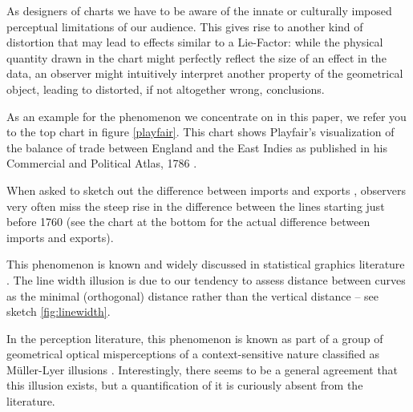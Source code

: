 As designers of charts we have to be aware of the innate or culturally imposed perceptual limitations of our audience. This gives rise to another kind of distortion that may lead to effects similar to a Lie-Factor: while the physical quantity drawn in the chart might  perfectly reflect the  size of an effect in the data, an observer might intuitively interpret another property of the geometrical object, leading to distorted, if not altogether wrong, conclusions. 

%


As an example for the phenomenon we concentrate on in this paper, we refer you to the top chart in  figure  \ref{playfair}. 
This chart shows Playfair's  visualization of the balance of trade between England and the East Indies as published in his Commercial and Political Atlas, 1786 \cite{playfair, playfair2}. 

When asked to sketch out the difference between imports and exports \citep{cleveland:1984}, observers very often miss the steep rise in the difference between the lines starting just before 1760 (see the chart at the bottom for the actual difference between imports and exports).

This phenomenon  is known and widely discussed in statistical graphics literature \citep{wainer:2000, robbins:2005}. The line width illusion is due to our  tendency to assess distance between curves as the minimal (orthogonal) distance rather than the  vertical distance -- see sketch \ref{fig:linewidth}.


In the perception literature, this phenomenon is known as part of a group of geometrical optical misperceptions of a context-sensitive nature classified as M\"uller-Lyer illusions \citep{day:1991}. Interestingly, there seems to be a general agreement that this illusion exists, but a quantification of it is curiously absent from the literature.


